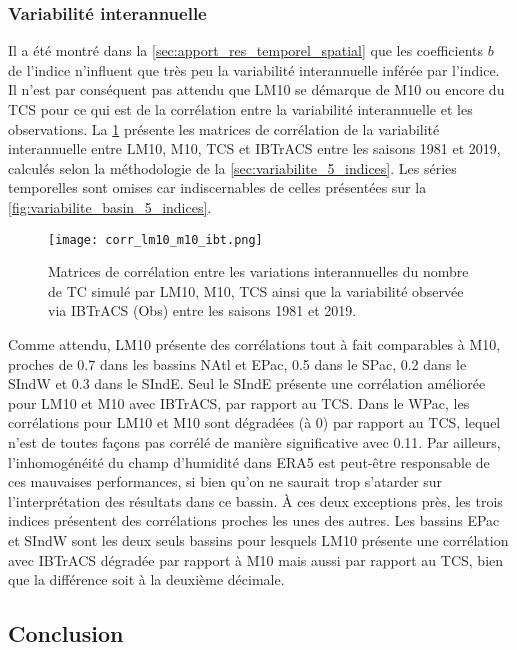 \documentclass[../main.tex]{subfiles}
\begin{document}
\subsubsection{Variabilité interannuelle}\label{sec:lm10_corr}

Il a été montré dans la \cref{sec:apport_res_temporel_spatial} que les coefficients $b$ de l'indice n'influent que très peu la variabilité interannuelle inférée
par l'indice. Il n'est par conséquent pas attendu que LM10 se démarque de M10 ou encore du TCS pour ce qui est de la corrélation entre la variabilité
interannuelle et les observations. La \cref{fig:corr_lm10_m10_ibt} présente les matrices de corrélation de la variabilité interannuelle entre LM10, M10, TCS et
IBTrACS entre les saisons 1981 et 2019, calculés selon la méthodologie de la \cref{sec:variabilite_5_indices}. Les séries temporelles sont omises car
indiscernables de celles présentées sur la \cref{fig:variabilite_basin_5_indices}.

\begin{figure}[htb]
    \centering
    \texttt{[image: corr\_lm10\_m10\_ibt.png]}
    \caption{Matrices de corrélation entre les variations interannuelles du nombre de TC simulé par LM10, M10, TCS ainsi que la variabilité observée via IBTrACS
    (Obs) entre les saisons 1981 et 2019.}
    \label{fig:corr_lm10_m10_ibt}
\end{figure}

Comme attendu, LM10 présente des corrélations tout à fait comparables à M10, proches de \num{0.7} dans les bassins NAtl et EPac, \num{0.5} dans le SPac,
\num{0.2} dans le SIndW et \num{0.3} dans le SIndE. Seul le SIndE présente une corrélation améliorée pour LM10 et M10 avec IBTrACS, par rapport au TCS. Dans le
WPac, les corrélations pour LM10 et M10 sont dégradées (à \num{0}) par rapport au TCS, lequel n'est de toutes façons pas corrélé de manière significative avec
\num{0.11}. Par ailleurs, l'inhomogénéité du champ d'humidité dans ERA5 est peut-être responsable de ces mauvaises performances, si bien qu'on ne saurait trop
s'atarder sur l'interprétation des résultats dans ce bassin. À ces deux exceptions près, les trois indices présentent des corrélations proches les unes des
autres. Les bassins EPac et SIndW sont les deux seuls bassins pour lesquels LM10 présente une corrélation avec IBTrACS dégradée par rapport à M10 mais aussi par
rapport au TCS, bien que la différence soit à la deuxième décimale.

\subsection{Conclusion}
\end{document}
